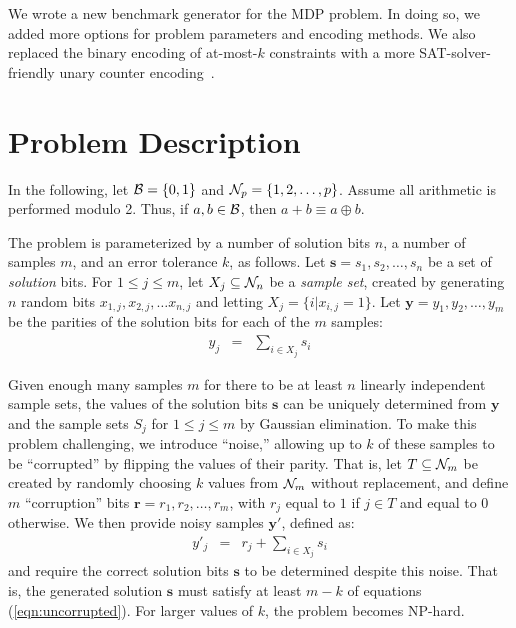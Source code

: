 \documentclass[10pt,conference]{IEEEtran}
\newcommand{\ints}[1]{{\cal N}_{#1}}
\newcommand{\bset}{{\cal B}}
\begin{document}
We wrote a new benchmark generator for the MDP problem.  In doing so, we
added more options for problem parameters and encoding methods.  We
also replaced the binary encoding of at-most-$k$ constraints with a
more SAT-solver-friendly unary counter encoding~\cite{card}.

\section{Problem Description}

In the following, let $\bset = \{0, 1\}$ and $\ints{p} = \{1, 2, \ldots, p\}$.
Assume all arithmetic is performed modulo 2.  Thus,
if $a, b \in \bset$, then $a+b \equiv a \oplus b$.

The problem is parameterized by a number of solution bits $n$, a
number of samples $m$, and an error tolerance $k$, as follows.  Let
$\bm{s} = s_1, s_2, \ldots, s_n$ be a set of {\em solution} bits.
For $1 \leq j \leq m$, let $X_j \subseteq \ints{n}$
be a {\em sample set}, created by generating $n$
random bits $x_{1,j}, x_{2,j}, \ldots x_{n,j}$
and letting $X_j = \{i | x_{i,j} = 1 \}$.  Let $\bm{y} = y_1, y_2, \ldots, y_m$ be the
parities of the solution bits for each of the $m$ samples:
\begin{eqnarray}
y_j & = & \sum_{i \in X_j} s_i \label{eqn:uncorrupted}
\end{eqnarray}

Given enough many samples $m$ for there to be at least $n$ linearly
independent sample sets, the values of the solution bits $\bm{s}$ can
be uniquely determined from $\bm{y}$ and the sample sets $S_j$ for
$1 \leq j \leq m$ by Gaussian elimination.  To make this problem
challenging, we introduce ``noise,'' allowing up to $k$ of these
samples to be ``corrupted'' by flipping the values of their parity.
That is, let $T \subseteq \ints{m}$ be created by randomly choosing
$k$ values from $\ints{m}$ without replacement, and define $m$
``corruption'' bits $\bm{r} = r_1, r_2, \ldots, r_m$, with $r_j$ equal
to $1$ if $j \in T$ and equal to $0$ otherwise.  
We then provide noisy samples $\bm{y}'$, defined as:
\begin{eqnarray}
y'_j & = & r_j + \sum_{i \in X_j} s_i \label{eqn:corrupted}
\end{eqnarray}
and require the correct solution bits $\bm{s}$ to be determined despite this noise.  That is, the generated solution $\bm{s}$ must satisfy at least $m-k$ of equations (\ref{eqn:uncorrupted}).
For larger values of $k$, the
problem becomes NP-hard.
\end{document}

